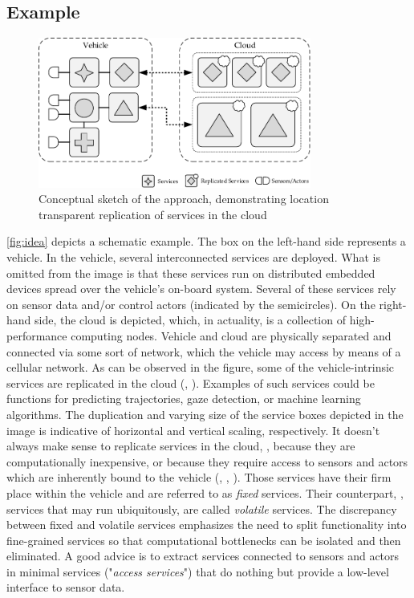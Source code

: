 \subsection{Example}

\begin{figure}[htpb]
  \centering
  \includegraphics[width=0.8\textwidth]{figures/idea.pdf}
  \caption[Conceptual sketch of the approach]{Conceptual sketch of the approach, demonstrating location transparent replication of services in the cloud}\label{fig:idea} 
\end{figure}

\autoref{fig:idea} depicts a schematic example. The box on the left-hand side represents a vehicle. In the vehicle, several interconnected services are deployed. What is omitted from the image is that these services run on distributed embedded devices spread over the vehicle's on-board system. Several of these services rely on sensor data and/or control actors (indicated by the semicircles). On the right-hand side, the cloud is depicted, which, in actuality, is a collection of high-performance computing nodes. Vehicle and cloud are physically separated and connected via some sort of network, which the vehicle may access by means of a cellular network. As can be observed in the figure, some of the vehicle-intrinsic services are replicated in the cloud (, ). Examples of such services could be functions for predicting trajectories, gaze detection, or machine learning algorithms. The duplication and varying size of the service boxes depicted in the image is indicative of horizontal and vertical scaling, respectively. It doesn't always make sense to replicate services in the cloud, \eg , because they are computationally inexpensive, or because they require access to sensors and actors which are inherently bound to the vehicle (, , ). Those services have their firm place within the vehicle and are referred to as \emph{fixed} services. Their counterpart, \ie , services that may run ubiquitously, are called \emph{volatile} services. The discrepancy between fixed and volatile services emphasizes the need to split functionality into fine-grained services so that computational bottlenecks can be isolated and then eliminated. A good advice is to extract services connected to sensors and actors in minimal services ("\emph{access services}") that do nothing but provide a low-level interface to sensor data.

